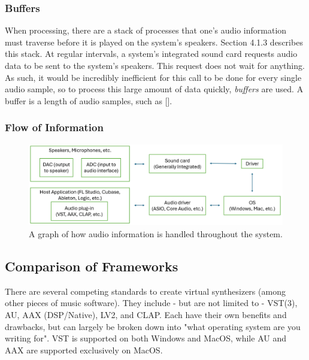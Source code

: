 \documentclass[12pt]{article}
\begin{document}
\subsubsection{Buffers}
When processing, there are a stack of processes that one's audio information must traverse before it is played on the system's speakers. Section 4.1.3 describes this stack. At regular intervals, a system's integrated sound card requests audio data to be sent to the system's speakers. This request does not wait for anything. As such, it would be incredibly inefficient for this call to be done for every single audio sample, so to process this large amount of data quickly, \textit{buffers} are used. A buffer is a length of audio samples, such as [].

\subsubsection{Flow of Information}

\begin{center}
	\begin{figure}[h]
		\includegraphics[scale=0.4]{image1.png}
		\caption{A graph of how audio information is handled throughout the system.}
	\end{figure}
\end{center}

\subsection{Comparison of Frameworks}
There are several competing standards to create virtual synthesizers (among other pieces of music software). They include - but are not limited to - VST(3), AU, AAX (DSP/Native), LV2, and CLAP. Each have their own benefits and drawbacks, but can largely be broken down into "what operating system are you writing for". VST is supported on both Windows and MacOS, while AU and AAX are supported exclusively on MacOS. 
\end{document}
